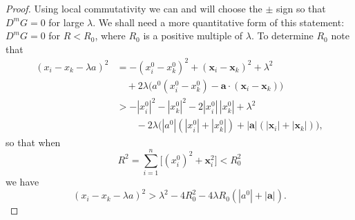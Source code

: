 \begin{proof}
Using local commutativity we can and will choose the $\pm$ sign so that
$D^mG=0$ for large $\lambda$. We shall need a more quantitative form of
this statement: $D^mG=0$ for $R<R_0$, where $R_0$ is a positive multiple of
$\lambda$. To determine $R_0$ note that
\begin{align*}
 (x_i-x_k-\lambda a)^2
 &=-(x_i^0-x_k^0)^2+(\mathbf{x}_i-\mathbf{x}_k)^2+\lambda^2\\[-2pt]
 &\quad+2\lambda\bigl(a^0(x_i^0-x_k^0)-\mathbf{a}\!\cdot(\mathbf{x}_i-\mathbf{x}_k)\bigr)\\
 &>-|x_i^0|^2-|x_k^0|^2-2|x_i^0|\,|x_k^0|+\lambda^2\\
 &\qquad-2\lambda\bigl(|a^0|(|x_i^0|+|x_k^0|)
 +|\mathbf{a}|(|\mathbf{x}_i|+|\mathbf{x}_k|)\bigr),
\end{align*}
so that when
\begin{equation*}
 R^2=\sum_{i=1}^{n}\bigl[(x_i^0)^2+\mathbf{x}_i^2\bigr]<R_0^2
\end{equation*}
we have
\begin{equation*}
 (x_i-x_k-\lambda a)^2>\lambda^2-4R_0^2
 -4\lambda R_0(|a^0|+|\mathbf{a}|).
\end{equation*}


\end{proof}
